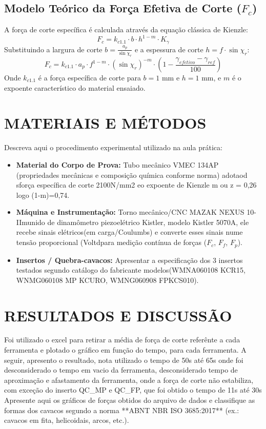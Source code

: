 \documentclass[a4paper,10pt]{article}
\begin{document}
\subsection{Modelo Teórico da Força Efetiva de Corte ($F_c$)}
A força de corte específica é calculada através da equação clássica de Kienzle:
\begin{equation}
    F_c = k_{c1.1} \cdot b \cdot h^{1-m} \cdot K_{\gamma}
\end{equation}
Substituindo a largura de corte $b = \frac{a_p}{\sin\chi_r}$ e a espessura de corte $h = f \cdot \sin\chi_r$:
\begin{equation}
    F_c = k_{c1.1} \cdot a_p \cdot f^{1-m} \cdot (\sin\chi_r)^{-m} \cdot \left(1 - \frac{\gamma_{efetivo} - \gamma_{ref}}{100}\right)
\end{equation}
Onde $k_{c1.1}$ é a força específica de corte para $b=1\text{ mm}$ e $h=1\text{ mm}$, e $m$ é o expoente característico do material ensaiado.

\section{MATERIAIS E MÉTODOS}
Descreva aqui o procedimento experimental utilizado na aula prática:
\begin{itemize}
    \item \textbf{Material do Corpo de Prova:} Tubo mecânico VMEC 134AP (propriedades mecânicas e composição química conforme norma) adotaod sforça específica de corte 2100N/mm2 eo expoente de Kienzle m ou z = 0,26 logo (1-m)=0,74.
    \item \textbf{Máquina e Instrumentação:} Torno mecânico/CNC MAZAK NEXUS 10-IImunido de dinamômetro piezoelétrico Kistler, modelo Kistler 5070A, ele recebe sinais elétricos(em carga/Coulumbs) e converte esses sinais nume tensão proporcional (Voltdpara medição contínua de forças ($F_c$, $F_f$, $F_p$).
    \item \textbf{Insertos / Quebra-cavacos:} Apresentar a especificação dos 3 insertos testados segundo catálogo do fabricante modelos(WMNA060108 KCR15, WNMG060108 MP KCURO, WMNG060908 FPKCS010).
\end{itemize}

\section{RESULTADOS E DISCUSSÃO}
Foi utilizado o excel para retirar a média de força de corte referênte a cada ferramenta e plotado o gráfico em função do tempo, para cada ferramenta. A seguir, apresento o resultado, nota utilizado o tempo de 50s até 65s onde foi desconsiderado o tempo em vacio da ferramenta, desconsiderado tempo de aproximação e afastamento da ferramenta, onde a força de corte não estabiliza, com exceção do inserto QC_MP e QC_FP, que foi obtido o tempo de 11s até 30s
Apresente aqui os gráficos de forças obtidos do arquivo de dados e classifique as formas dos cavacos segundo a norma **ABNT NBR ISO 3685:2017** (ex.: cavacos em fita, helicoidais, arcos, etc.).
\end{document}

